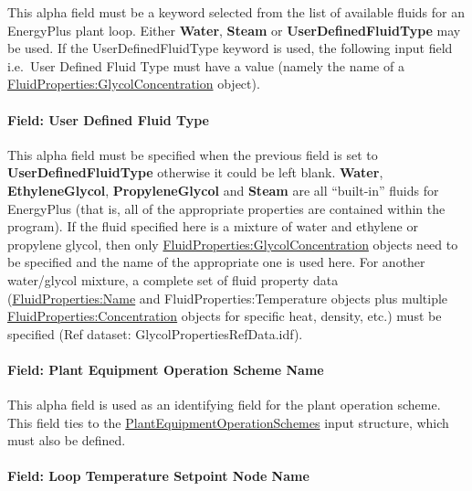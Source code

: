 This alpha field must be a keyword selected from the list of available fluids for an EnergyPlus plant loop. Either \textbf{Water}, \textbf{Steam} or \textbf{UserDefinedFluidType} may be used. If the UserDefinedFluidType keyword is used, the following input field i.e.~User Defined Fluid Type must have a value (namely the name of a \hyperref[fluidpropertiesglycolconcentration]{FluidProperties:GlycolConcentration} object).

\paragraph{Field: User Defined Fluid Type}\label{field-user-defined-fluid-type-000}

This alpha field must be specified when the previous field is set to \textbf{UserDefinedFluidType} otherwise it could be left blank. \textbf{Water}, \textbf{EthyleneGlycol}, \textbf{PropyleneGlycol} and \textbf{Steam} are all ``built-in'' fluids for EnergyPlus (that is, all of the appropriate properties are contained within the program). If the fluid specified here is a mixture of water and ethylene or propylene glycol, then only \hyperref[fluidpropertiesglycolconcentration]{FluidProperties:GlycolConcentration} objects need to be specified and the name of the appropriate one is used here. For another water/glycol mixture, a complete set of fluid property data (\hyperref[fluidpropertiesname]{FluidProperties:Name} and FluidProperties:Temperature objects plus multiple \hyperref[fluidpropertiesconcentration]{FluidProperties:Concentration} objects for specific heat, density, etc.) must be specified (Ref dataset: GlycolPropertiesRefData.idf).

\paragraph{Field: Plant Equipment Operation Scheme Name}\label{field-plant-equipment-operation-scheme-name}

This alpha field is used as an identifying field for the plant operation scheme. This field ties to the \hyperref[plantequipmentoperationschemes]{PlantEquipmentOperationSchemes} input structure, which must also be defined.

\paragraph{Field: Loop Temperature Setpoint Node Name}\label{field-loop-temperature-setpoint-node-name}

